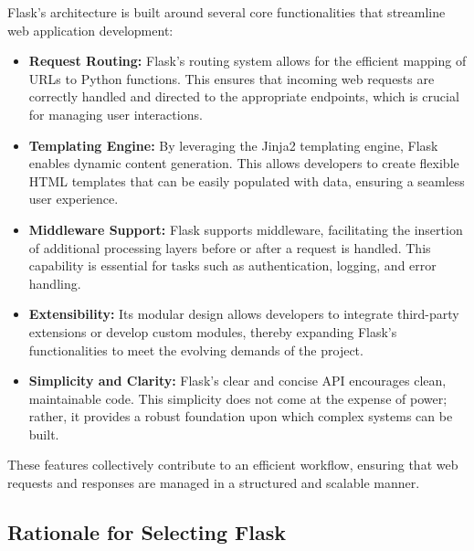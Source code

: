 Flask's architecture is built around several core functionalities that streamline web application development:
\begin{itemize}
    \item \textbf{Request Routing:} Flask’s routing system allows for the efficient mapping of URLs to Python functions. This ensures that incoming web requests are correctly handled and directed to the appropriate endpoints, which is crucial for managing user interactions.
    \item \textbf{Templating Engine:} By leveraging the Jinja2 templating engine, Flask enables dynamic content generation. This allows developers to create flexible HTML templates that can be easily populated with data, ensuring a seamless user experience.
    \item \textbf{Middleware Support:} Flask supports middleware, facilitating the insertion of additional processing layers before or after a request is handled. This capability is essential for tasks such as authentication, logging, and error handling.
    \item \textbf{Extensibility:} Its modular design allows developers to integrate third-party extensions or develop custom modules, thereby expanding Flask's functionalities to meet the evolving demands of the project.
    \item \textbf{Simplicity and Clarity:} Flask’s clear and concise API encourages clean, maintainable code. This simplicity does not come at the expense of power; rather, it provides a robust foundation upon which complex systems can be built.
\end{itemize}

These features collectively contribute to an efficient workflow, ensuring that web requests and responses are managed in a structured and scalable manner.

\subsection{Rationale for Selecting Flask}

